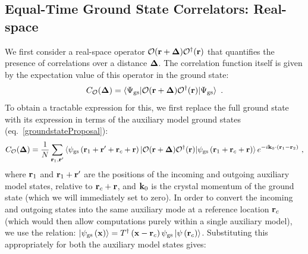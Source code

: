 \documentclass[reprint,hidelinks,onecolumn]{revtex4-2}
\begin{document}
\subsection{Equal-Time Ground State Correlators: Real-space}\label{staticCorr}
We first consider a real-space operator \(\mathcal{O}({\bf r} + {\bf \Delta})\mathcal{O}^\dagger({\bf r})\) that quantifies the presence of correlations over a distance \({\bf \Delta}\). The correlation function itself is given by the expectation value of this operator in the ground state:
\begin{equation}\begin{aligned}
	C_{\mathcal{O}}({\bf \Delta}) = \braket{\Psi_\text{gs} | \mathcal{O}({\bf r} + {\bf \Delta})\mathcal{O}^\dagger({\bf r}) | \Psi_\text{gs}}~.
\end{aligned}\end{equation}
To obtain a tractable expression for this, we first replace the full ground state with its expression in terms of the auxiliary model ground states (eq.~\ref{groundstateProposal}):
\begin{equation}\begin{aligned}
	C_{\mathcal{O}}({\bf \Delta}) = \frac{1}{N}\sum_{{\bf r}_1,{\bf r}^\prime}\braket{\psi_\text{gs}\left({\bf r}_1 + {\bf r}^\prime + {\bf r}_c + {\bf r}\right)  | \mathcal{O}({\bf r} + {\bf \Delta})\mathcal{O}^\dagger({\bf r}) | \psi_\text{gs}\left({\bf r}_1 + {\bf r}_c + {\bf r}\right)} e^{-i{\bf k}_0\cdot\left({\bf r}_1 - {\bf r}_2\right)}~,
\end{aligned}\end{equation}
where \({\bf r}_1\) and \({\bf r}_1 + {\bf r}^\prime\) are the positions of the incoming and outgoing auxiliary model states, relative to \({\bf r}_c + {\bf r}\), and \({\bf k}_0\) is the crystal momentum of the ground state (which we will immediately set to zero). In order to convert the incoming and outgoing states into the same auxiliary mode at a reference location \({\bf r}_c\) (which would then allow computations purely within a single auxiliary model), we use the relation: \(\ket{\psi_\text{gs}\left({\bf x}\right)} = T^\dagger\left({\bf x} - {\bf r}_c\right)\psi_\text{gs}\ket{\psi\left({\bf r}_c \right)}\). Substituting this appropriately for both the auxiliary model states gives:
\end{document}

